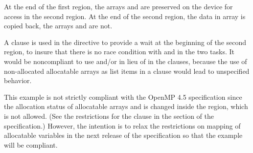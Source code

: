 At the end of the first  region, the arrays  and  are preserved on the device 
for access in the second  region. At the end of the second  region, the data 
in array  is copied back, the arrays  and  are not.

A  clause is used in the  directive to provide a wait at the beginning of the second 
 region, to insure that there is no race condition with  and  in the two tasks.
It would be noncompliant to use  and/or  in lieu of  in the  clauses, 
because the use of non-allocated allocatable arrays as list items in a  clause would 
lead to unspecified behavior. 

\noteheader{--} This example is not strictly compliant with the OpenMP 4.5 specification since the allocation status
of allocatable arrays  and  is changed inside the  region, which is not allowed.
(See the restrictions for the  clause in the  
section of the specification.)
However, the intention is to relax the restrictions on mapping of allocatable variables in the next release
of the specification so that the example will be compliant.

